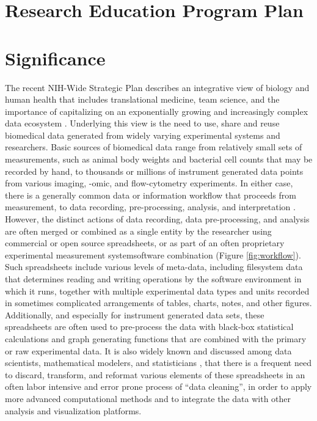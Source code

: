 \documentclass[pdftex,english,11pt,parskip=half]{scrartcl}
\begin{document}
\def\bf{\normalfont\bfseries}
\pagestyle{empty}

\section*{Research Education Program Plan}

\section{Significance}
\vspace{-0.1in}

The recent NIH-Wide Strategic Plan \cite{nih2016strategic} describes an
integrative view of biology and human health that includes translational
medicine, team science, and the importance of capitalizing on an exponentially 
growing and increasingly complex data ecosystem \cite{nih2018data}.  Underlying 
this view is the need to use, share and reuse biomedical data generated from widely 
varying experimental systems and researchers. Basic sources of biomedical data range 
from relatively small sets of measurements, such as animal body weights and bacterial 
cell counts that may be recorded by hand, to thousands or millions of instrument generated 
data points from various imaging, -omic, and flow-cytometry experiments. In either case, 
there is a generally common data or information workflow that proceeds 
from measurement, to data recording, pre-processing, analysis, and interpretation 
\cite{}.  However, the distinct actions of data recording, data pre-processing, and analysis 
are often merged or combined as a single entity by the researcher using commercial or open 
source spreadsheets, or as part of an often proprietary experimental measurement 
system\/software combination (Figure \ref{fig:workflow}).  Such spreadsheets include various 
levels of meta-data, including filesystem data that determines 
reading and writing operations by the software environment in which it runs, together with multiple 
experimental data types and units recorded in sometimes complicated arrangements of tables, 
charts, notes, and other figures.  Additionally, and especially for instrument generated data sets, 
these spreadsheets are often used to pre-process the data with black-box statistical calculations 
and graph generating 
functions that are combined with the primary or raw experimental data.  It is also widely 
known and discussed among data scientists, mathematical modelers, and statisticians 
\cite{broman2018data, krishnan2016towards}, that there is a frequent need to discard, 
transform, and reformat various elements of these spreadsheets in an often labor intensive and error 
prone process of ``data cleaning'', in order to apply more advanced computational methods 
and to integrate the data with other analysis and visualization platforms.
\end{document}
